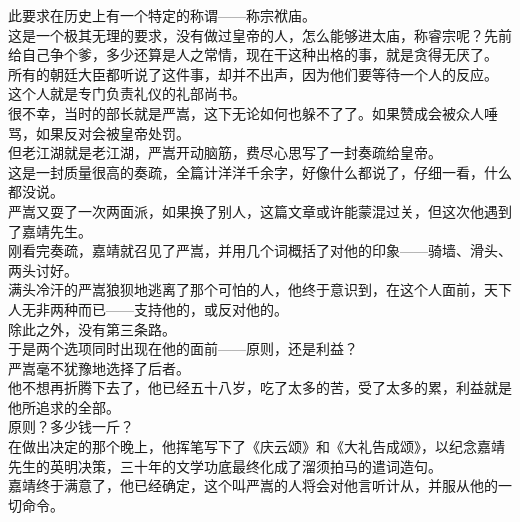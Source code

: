 \begin{multicols}{\theparacolNo}
此要求在历史上有一个特定的称谓——称宗袱庙。\\

这是一个极其无理的要求，没有做过皇帝的人，怎么能够进太庙，称睿宗呢？先前给自己争个爹，多少还算是人之常情，现在干这种出格的事，就是贪得无厌了。\\

所有的朝廷大臣都听说了这件事，却并不出声，因为他们要等待一个人的反应。\\

这个人就是专门负责礼仪的礼部尚书。\\

很不幸，当时的部长就是严嵩，这下无论如何也躲不了了。如果赞成会被众人唾骂，如果反对会被皇帝处罚。\\

但老江湖就是老江湖，严嵩开动脑筋，费尽心思写了一封奏疏给皇帝。\\

这是一封质量很高的奏疏，全篇计洋洋千余字，好像什么都说了，仔细一看，什么都没说。\\

严嵩又耍了一次两面派，如果换了别人，这篇文章或许能蒙混过关，但这次他遇到了嘉靖先生。\\

刚看完奏疏，嘉靖就召见了严嵩，并用几个词概括了对他的印象——骑墙、滑头、两头讨好。\\

满头冷汗的严嵩狼狈地逃离了那个可怕的人，他终于意识到，在这个人面前，天下人无非两种而已——支持他的，或反对他的。\\

除此之外，没有第三条路。\\

于是两个选项同时出现在他的面前——原则，还是利益？\\

严嵩毫不犹豫地选择了后者。\\

他不想再折腾下去了，他已经五十八岁，吃了太多的苦，受了太多的累，利益就是他所追求的全部。\\

原则？多少钱一斤？\\

在做出决定的那个晚上，他挥笔写下了《庆云颂》和《大礼告成颂》，以纪念嘉靖先生的英明决策，三十年的文学功底最终化成了溜须拍马的遣词造句。\\

嘉靖终于满意了，他已经确定，这个叫严嵩的人将会对他言听计从，并服从他的一切命令。\\


\end{multicols}
